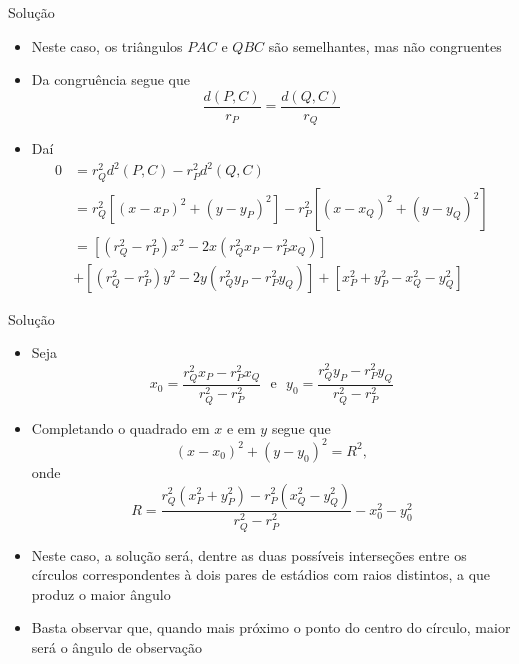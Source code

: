 \begin{frame}[fragile]{Solução}

    \begin{itemize}
        \item Neste caso, os triângulos $PAC$ e $QBC$ são semelhantes, mas não congruentes
        \pause

        \item Da congruência segue que
        \[
            \frac{d(P, C)}{r_P} = \frac{d(Q, C)}{r_Q}
        \] 
        \pause

        \item Daí
        \begin{align*}
        0 &= r_Q^2d^2(P, C) - r_P^2d^2(Q, C) \\
        &= r_Q^2\left[(x - x_P)^2 + (y - y_P)^2\right] - r_P^2\left[(x - x_Q)^2 + (y -y_Q)^2\right]\\
        &= \left[ (r_Q^2 - r_P^2)x^2 -2x(r_Q^2x_P - r_P^2x_Q) \right] \\
        &+ \left[ (r_Q^2 - r_P^2)y^2 -2y(r_Q^2y_P - r_P^2y_Q) \right] + \left[ x_P^2 + y_P^2 - x_Q^2 - y_Q^2\right]
        \end{align*}
    \end{itemize}

\end{frame}

\begin{frame}[fragile]{Solução}

    \begin{itemize}
        \item Seja
        \[
            x_0 = \frac{r_Q^2x_P - r_P^2x_Q}{r_Q^2 - r_P^2}\ \ \ \mbox{e}\ \ \ 
            y_0 = \frac{r_Q^2y_P - r_P^2y_Q}{r_Q^2 - r_P^2}
        \]
        \pause

        \item Completando o quadrado em $x$ e em $y$ segue que
        \[
            (x - x_0)^2 + (y - y_0)^2 = R^2,
        \]
        onde
        \[
            R = \frac{r_Q^2(x_P^2 + y_P^2) - r_P^2(x_Q^2 - y_Q^2)}{r_Q^2 - r_P^2} - x_0^2 - y_0^2
        \]
        \pause

        \item Neste caso, a solução será, dentre as duas possíveis interseções entre os 
            círculos correspondentes à dois pares de estádios com raios distintos, a que 
            produz o maior ângulo
        \pause

        \item Basta observar que, quando mais próximo o ponto do centro do círculo, maior será o
            ângulo de observação
    \end{itemize}

\end{frame}

